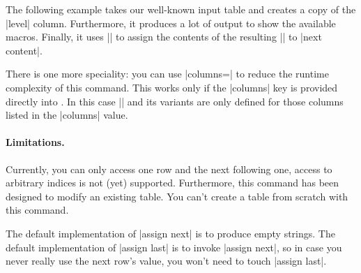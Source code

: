\begin{command}{}
The following example takes our well-known input table and creates a copy of the |level| column. Furthermore, it produces a lot of output to show the available macros. Finally, it uses |\pgfkeyslet| to assign the contents of the resulting |\entry| to |next content|.
\begin{codeexample}[]
\table
{}\table

\pgfplotstabletypeset[
	column type=l,
	columns={level,new},
	columns/new/.style={string type}
]\table
\end{codeexample}

There is one more speciality: you can use |columns=| to reduce the runtime complexity of this command. This works only if the |columns| key is provided directly into . In this case |\thisrow| and its variants are only defined for those columns listed in the |columns| value.

\paragraph{Limitations.} Currently, you can only access one row and the next following one, access to arbitrary indices is not (yet) supported. Furthermore, this command has been designed to modify an existing table. You can't create a table from scratch with this command.

The default implementation of |assign next| is to produce empty strings. The default implementation of |assign last| is to invoke |assign next|, so in case you never really use the next row's value, you won't need to touch |assign last|.
\end{command}

